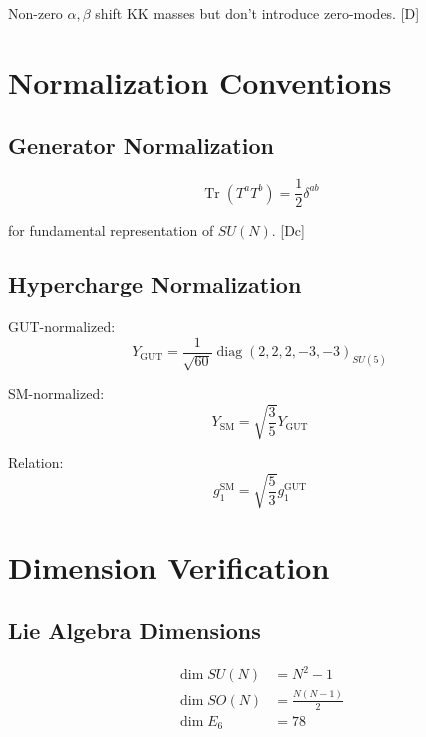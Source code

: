 \documentclass[11pt,a4paper]{article}
\newcommand{\tagD}{\textcolor{blue!70!black}{[D]}}
\newcommand{\tagDc}{\textcolor{blue!50!black}{[Dc]}}
\DeclareMathOperator{\Tr}{Tr}
\DeclareMathOperator{\diag}{diag}
\begin{document}
Non-zero $\alpha, \beta$ shift KK masses but don't introduce zero-modes. \tagD

\section{Normalization Conventions}
\label{app:norms}

\subsection{Generator Normalization}

\begin{equation}
\label{eq:gen-norm}
\Tr(T^a T^b) = \frac{1}{2} \delta^{ab}
\end{equation}

for fundamental representation of $SU(N)$. \tagDc

\subsection{Hypercharge Normalization}

GUT-normalized:
\begin{equation}
\label{eq:Y-gut}
Y_{\text{GUT}} = \frac{1}{\sqrt{60}} \diag(2,2,2,-3,-3)_{SU(5)}
\end{equation}

SM-normalized:
\begin{equation}
\label{eq:Y-sm}
Y_{\text{SM}} = \sqrt{\frac{3}{5}} Y_{\text{GUT}}
\end{equation}

Relation:
\begin{equation}
\label{eq:g1-conversion}
g_1^{\text{SM}} = \sqrt{\frac{5}{3}} g_1^{\text{GUT}}
\end{equation}

\section{Dimension Verification}
\label{app:dim}

\subsection{Lie Algebra Dimensions}

\begin{align}
\label{eq:dim-su}
\dim SU(N) &= N^2 - 1 \\
\label{eq:dim-so}
\dim SO(N) &= \frac{N(N-1)}{2} \\
\label{eq:dim-e6}
\dim E_6 &= 78
\end{align}
\end{document}
